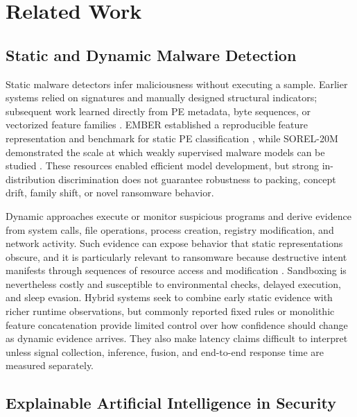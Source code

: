 \documentclass{IEEEtran}
\begin{document}
\section{Related Work}
\label{sec:related-work}

\subsection{Static and Dynamic Malware Detection}

Static malware detectors infer maliciousness without executing a sample. Earlier systems relied on signatures and manually designed structural indicators; subsequent work learned directly from PE metadata, byte sequences, or vectorized feature families \cite{saxe2015deep,raff2018malware}. EMBER established a reproducible feature representation and benchmark for static PE classification \cite{anderson2018ember}, while SOREL-20M demonstrated the scale at which weakly supervised malware models can be studied \cite{harang2020sorel}. These resources enabled efficient model development, but strong in-distribution discrimination does not guarantee robustness to packing, concept drift, family shift, or novel ransomware behavior.

Dynamic approaches execute or monitor suspicious programs and derive evidence from system calls, file operations, process creation, registry modification, and network activity. Such evidence can expose behavior that static representations obscure, and it is particularly relevant to ransomware because destructive intent manifests through sequences of resource access and modification \cite{kharraz2015cutting,sgandurra2016automated}. Sandboxing is nevertheless costly and susceptible to environmental checks, delayed execution, and sleep evasion. Hybrid systems seek to combine early static evidence with richer runtime observations, but commonly reported fixed rules or monolithic feature concatenation provide limited control over how confidence should change as dynamic evidence arrives. They also make latency claims difficult to interpret unless signal collection, inference, fusion, and end-to-end response time are measured separately.

\subsection{Explainable Artificial Intelligence in Security}
\end{document}
